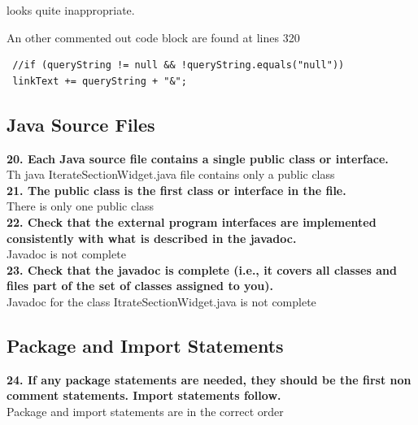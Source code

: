 \documentclass{article}
\begin{document}
\begin{flushleft}
\vspace{0.5cm}          
looks quite inappropriate.\\
\vspace{0.5cm}


An other commented out code block are found at lines 320\\
\vspace{0.5cm}
\begin{lstlisting}
 //if (queryString != null && !queryString.equals("null")) 
 linkText += queryString + "&"; 
\end{lstlisting}
\vspace{0.5cm}

\subsection{Java Source Files}
\textbf{20. Each Java source file contains a single public class or interface.}\\
\vspace{0.5cm}
Th java IterateSectionWidget.java file contains only a public class\\
\vspace{0.5cm}
\textbf{21. The public class is the first class or interface in the file.}\\
\vspace{0.5cm}
There is only one public class\\
\vspace{0.5cm}
\textbf{22. Check that the external program interfaces are implemented consistently with what is described in the javadoc.}\\
\vspace{0.5cm}
Javadoc is not complete\\
\vspace{0.5cm}
\newpage
\textbf{23. Check that the javadoc is complete (i.e., it covers all classes and files part of the set of classes assigned to you).}\\
\vspace{0.5cm}
Javadoc for the class ItrateSectionWidget.java is not complete\\
\vspace{0.5cm}



\subsection{Package and Import Statements}
\textbf{24. If any package statements are needed, they should be the first non comment statements. Import statements follow.}\\
\vspace{0.5cm}
Package and import statements are in the correct order\\
\vspace{0.5cm}



\end{flushleft}
\end{document}
